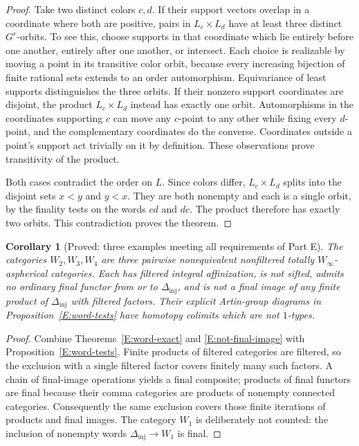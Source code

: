 \documentclass[11pt,a4paper]{article}
\newcommand{\Winfty}{W_\infty}
\newcommand{\Dinj}{\Delta_{\mathrm{inj}}}
\newtheorem{corollary}[theorem]{Corollary}
\theoremstyle{definition}
\begin{document}
\begin{proof}
Take two distinct colors $c,d$. If their support vectors overlap
in a coordinate where both are positive, pairs in $L_c\times L_d$
have at least three distinct $G^r$-orbits. To see this, choose
supports in that coordinate which lie entirely before one another,
entirely after one another, or intersect. Each choice is realizable
by moving a point in its transitive color orbit, because every
increasing bijection of finite rational sets extends to an
order automorphism. Equivariance of least supports distinguishes
the three orbits.
If their nonzero support coordinates are disjoint, the product
$L_c\times L_d$ instead has exactly one orbit. Automorphisms in
the coordinates supporting $c$ can move any $c$-point to any other
while fixing every $d$-point, and the complementary coordinates
do the converse. Coordinates outside a point's support act
trivially on it by definition. These observations prove
transitivity of the product.

Both cases contradict the order on $L$. Since colors differ,
$L_c\times L_d$ splits into the disjoint sets $x<y$ and $y<x$.
They are both nonempty and each is a single orbit, by the
finality tests on the words $cd$ and $dc$. The product therefore
has exactly two orbits. This contradiction proves the theorem.
\end{proof}

\begin{corollary}[Proved: three examples meeting all requirements of Part E]\label{E:three-examples}
The categories $W_2,W_3,W_4$ are three pairwise nonequivalent
nonfiltered totally $\Winfty$-aspherical categories. Each has
filtered integral affinization, is not sifted, admits no ordinary
final functor from or to $\Dinj$, and is not a final image of any
finite product of $\Dinj$ with filtered factors. Their explicit
Artin-group diagrams in Proposition~\ref{E:word-tests} have
homotopy colimits which are not $1$-types.
\end{corollary}
\begin{proof}
Combine Theorems~\ref{E:word-exact} and
\ref{E:not-final-image} with Proposition~\ref{E:word-tests}.
Finite products of filtered categories are filtered, so the
exclusion with a single filtered factor covers finitely many such
factors. A chain of final-image operations yields a final
composite; products of final functors are final because their
comma categories are products of nonempty connected categories.
Consequently the same exclusion covers those finite iterations
of products and final images. The category $W_1$ is deliberately
not counted: the inclusion of nonempty words
$\Dinj\to W_1$ is final.
\end{proof}
\end{document}
